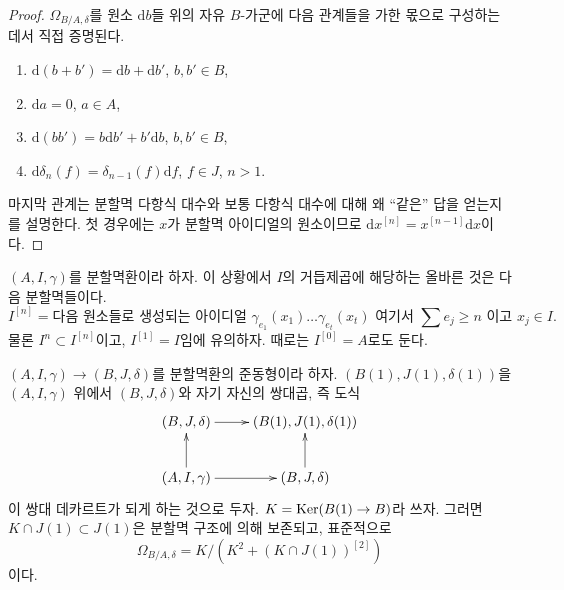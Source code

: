 \begin{proof}
$\Omega_{B/A, \delta}$를 원소 $\text{d}b$들 위의 자유 $B$-가군에
다음 관계들을 가한 몫으로 구성하는 데서 직접 증명된다.
\begin{enumerate}
\item $\text{d}(b + b') = \text{d}b + \text{d}b'$, $b, b' \in B$,
\item $\text{d}a = 0$, $a \in A$,
\item $\text{d}(bb') = b \text{d}b' + b' \text{d}b$, $b, b' \in B$,
\item $\text{d}\delta_n(f) = \delta_{n - 1}(f)\text{d}f$, $f \in J$, $n > 1$.
\end{enumerate}
마지막 관계는 분할멱 다항식 대수와 보통 다항식 대수에 대해
왜 ``같은'' 답을 얻는지를 설명한다. 첫 경우에는 $x$가 분할멱
아이디얼의 원소이므로 $\text{d}x^{[n]} = x^{[n - 1]}\text{d}x$이다.
\end{proof}

\noindent
$(A, I, \gamma)$를 분할멱환이라 하자. 이 상황에서 $I$의
거듭제곱에 해당하는 올바른 것은 다음 분할멱들이다.
$$
I^{[n]} = \text{다음 원소들로 생성되는 아이디얼 }
\gamma_{e_1}(x_1) \ldots \gamma_{e_t}(x_t)
\text{ 여기서 }\sum e_j \geq n\text{ 이고 }x_j \in I.
$$
물론 $I^n \subset I^{[n]}$이고, $I^{[1]} = I$임에 유의하자.
때로는 $I^{[0]} = A$로도 둔다.

\begin{lemma}
\label{lemma-diagonal-and-differentials}
$(A, I, \gamma) \to (B, J, \delta)$를 분할멱환의 준동형이라 하자.
$(B(1), J(1), \delta(1))$을 $(A, I, \gamma)$ 위에서
$(B, J, \delta)$와 자기 자신의 쌍대곱, 즉 도식
$$
\xymatrix{
(B, J, \delta) \ar[r] & (B(1), J(1), \delta(1)) \\
(A, I, \gamma) \ar[r] \ar[u] & (B, J, \delta) \ar[u]
}
$$
이 쌍대 데카르트가 되게 하는 것으로 두자.
$K = \mathop{\mathrm{Ker}}(B(1) \to B)$라 쓰자. 그러면
$K \cap J(1) \subset J(1)$은 분할멱 구조에 의해 보존되고,
표준적으로
$$
\Omega_{B/A, \delta} = K/ \left(K^2 + (K \cap J(1))^{[2]}\right)
$$
이다.
\end{lemma}

